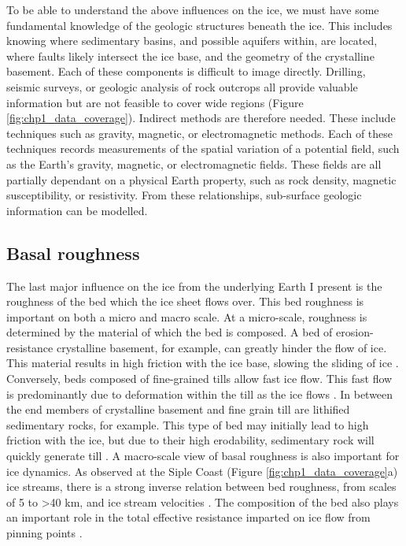 To be able to understand the above influences on the ice, we must have some fundamental knowledge of the geologic structures beneath the ice. This includes knowing where sedimentary basins, and possible aquifers within, are located, where faults likely intersect the ice base, and the geometry of the crystalline basement. Each of these components is difficult to image directly. Drilling, seismic surveys, or geologic analysis of rock outcrops all provide valuable information but are not feasible to cover wide regions (Figure \ref{fig:chp1_data_coverage}). Indirect methods are therefore needed. These include techniques such as gravity, magnetic, or electromagnetic methods. Each of these techniques records measurements of the spatial variation of a potential field, such as the Earth's gravity, magnetic, or electromagnetic fields. These fields are all partially dependant on a physical Earth property, such as rock density, magnetic susceptibility, or resistivity. From these relationships, sub-surface geologic information can be modelled. 


\subsection{Basal roughness}


The last major influence on the ice from the underlying Earth I present is the roughness of the bed which the ice sheet flows over. This bed roughness is important on both a micro and macro scale. At a micro-scale, roughness is determined by the material of which the bed is composed. A bed of erosion-resistance crystalline basement, for example, can greatly hinder the flow of ice. This material results in high friction with the ice base, slowing the sliding of ice \citep{bellinfluence1998}. Conversely, beds composed of fine-grained tills allow fast ice flow. This fast flow is predominantly due to deformation within the till as the ice flows \citep{alleydeformation1986}. In between the end members of crystalline basement and fine grain till are lithified sedimentary rocks, for example. This type of bed may initially lead to high friction with the ice, but due to their high erodability, sedimentary rock will quickly generate till \citep{anandakrishnaninfluence1998}. A macro-scale view of basal roughness is also important for ice dynamics. As observed at the Siple Coast (Figure \ref{fig:chp1_data_coverage}a) ice streams, there is a strong inverse relation between bed roughness, from scales of 5 to >40 km, and ice stream velocities \citep{siegertmacroscale2004}. The composition of the bed also plays an important role in the total effective resistance imparted on ice flow from pinning points \citep{stillmechanical2019}. \\

